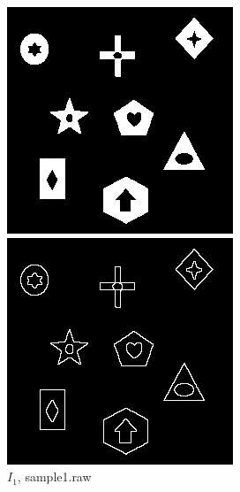 \documentclass[12pt,a4paper,notitlepage,oneside,amsmath,amssymb]{article}
\begin{document}
\begin{CJK*}{UTF8}{bkai}
\begin{enumerate}[label=(\alph*)]
	      \begin{figure}[hbt!]
		      \centering
		      \begin{minipage}{.33\textwidth}
			      \centering
			      \includegraphics[width=.9\linewidth]{sample1}
			      \caption*{\(I_1\), sample1.raw}
		      \end{minipage}%
		      \begin{minipage}{.33\textwidth}
			      \centering
			      \includegraphics[width=.9\linewidth]{image_B_inner}

\end{minipage}
\end{figure}
\end{enumerate}
\end{CJK*}
\end{document}
